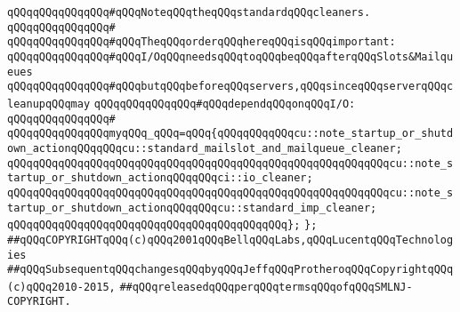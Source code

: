 \newline
\verb|qQQqqQQqqQQqqQQq#qQQqNoteqQQqtheqQQqstandardqQQqcleaners.|\newline
\verb|qQQqqQQqqQQqqQQq#|\newline
\verb|qQQqqQQqqQQqqQQq#qQQqTheqQQqorderqQQqhereqQQqisqQQqimportant:|\newline
\verb|qQQqqQQqqQQqqQQq#qQQqI/OqQQqneedsqQQqtoqQQqbeqQQqafterqQQqSlots&Mailqueues|\newline
\verb|qQQqqQQqqQQqqQQq#qQQqbutqQQqbeforeqQQqservers,qQQqsinceqQQqserverqQQqcleanupqQQqmay|\newline
\verb|qQQqqQQqqQQqqQQq#qQQqdependqQQqonqQQqI/O:|\newline
\verb|qQQqqQQqqQQqqQQq#|\newline
\verb|qQQqqQQqqQQqqQQqmyqQQq_qQQq=qQQq{qQQqqQQqqQQqcu::note_startup_or_shutdown_actionqQQqqQQqcu::standard_mailslot_and_mailqueue_cleaner;|\newline
\verb|qQQqqQQqqQQqqQQqqQQqqQQqqQQqqQQqqQQqqQQqqQQqqQQqqQQqqQQqqQQqcu::note_startup_or_shutdown_actionqQQqqQQqci::io_cleaner;|\newline
\verb|qQQqqQQqqQQqqQQqqQQqqQQqqQQqqQQqqQQqqQQqqQQqqQQqqQQqqQQqqQQqcu::note_startup_or_shutdown_actionqQQqqQQqcu::standard_imp_cleaner;|\newline
\verb|qQQqqQQqqQQqqQQqqQQqqQQqqQQqqQQqqQQqqQQqqQQq};|\newline
\newline
\verb|};|\newline
\newline
\newline
\verb|##qQQqCOPYRIGHTqQQq(c)qQQq2001qQQqBellqQQqLabs,qQQqLucentqQQqTechnologies|\newline
\verb|##qQQqSubsequentqQQqchangesqQQqbyqQQqJeffqQQqProtheroqQQqCopyrightqQQq(c)qQQq2010-2015,|\newline
\verb|##qQQqreleasedqQQqperqQQqtermsqQQqofqQQqSMLNJ-COPYRIGHT.|\newline

